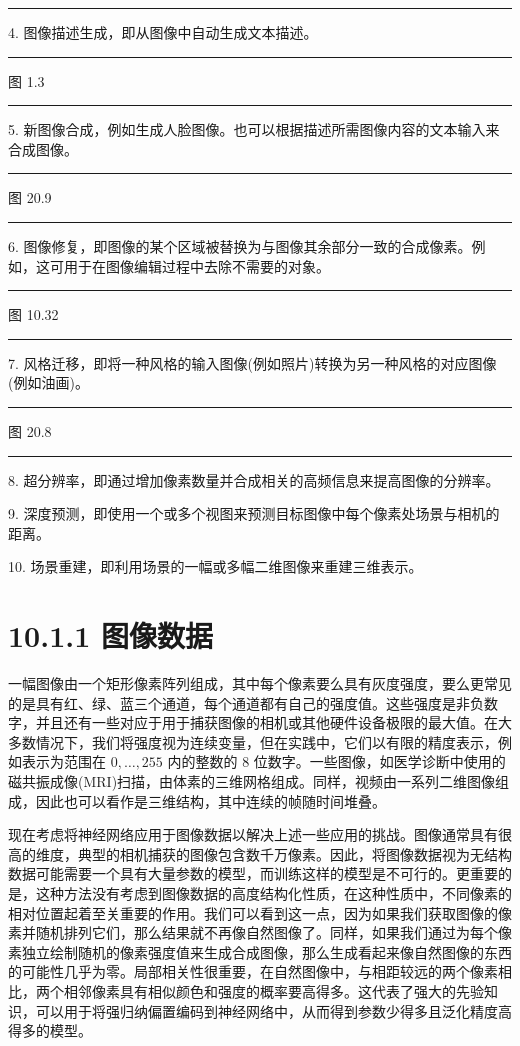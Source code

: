 \documentclass[10pt]{article}
\newcommand{\HRule}{\begin{center}\rule{0.9\linewidth}{0.2mm}\end{center}}
\begin{document}
\HRule

4. 图像描述生成，即从图像中自动生成文本描述。

\HRule

图 1.3

\HRule

5. 新图像合成，例如生成人脸图像。也可以根据描述所需图像内容的文本输入来合成图像。

\HRule

图 20.9

\HRule

6. 图像修复，即图像的某个区域被替换为与图像其余部分一致的合成像素。例如，这可用于在图像编辑过程中去除不需要的对象。

\HRule

图 10.32

\HRule

7. 风格迁移，即将一种风格的输入图像(例如照片)转换为另一种风格的对应图像(例如油画)。

\HRule

图 20.8

\HRule

8. 超分辨率，即通过增加像素数量并合成相关的高频信息来提高图像的分辨率。

9. 深度预测，即使用一个或多个视图来预测目标图像中每个像素处场景与相机的距离。

10. 场景重建，即利用场景的一幅或多幅二维图像来重建三维表示。

\section*{10.1.1 图像数据}

一幅图像由一个矩形像素阵列组成，其中每个像素要么具有灰度强度，要么更常见的是具有红、绿、蓝三个通道，每个通道都有自己的强度值。这些强度是非负数字，并且还有一些对应于用于捕获图像的相机或其他硬件设备极限的最大值。在大多数情况下，我们将强度视为连续变量，但在实践中，它们以有限的精度表示，例如表示为范围在 \(0,\ldots ,{255}\) 内的整数的 8 位数字。一些图像，如医学诊断中使用的磁共振成像(MRI)扫描，由体素的三维网格组成。同样，视频由一系列二维图像组成，因此也可以看作是三维结构，其中连续的帧随时间堆叠。

现在考虑将神经网络应用于图像数据以解决上述一些应用的挑战。图像通常具有很高的维度，典型的相机捕获的图像包含数千万像素。因此，将图像数据视为无结构数据可能需要一个具有大量参数的模型，而训练这样的模型是不可行的。更重要的是，这种方法没有考虑到图像数据的高度结构化性质，在这种性质中，不同像素的相对位置起着至关重要的作用。我们可以看到这一点，因为如果我们获取图像的像素并随机排列它们，那么结果就不再像自然图像了。同样，如果我们通过为每个像素独立绘制随机的像素强度值来生成合成图像，那么生成看起来像自然图像的东西的可能性几乎为零。局部相关性很重要，在自然图像中，与相距较远的两个像素相比，两个相邻像素具有相似颜色和强度的概率要高得多。这代表了强大的先验知识，可以用于将强归纳偏置编码到神经网络中，从而得到参数少得多且泛化精度高得多的模型。
\end{document}
